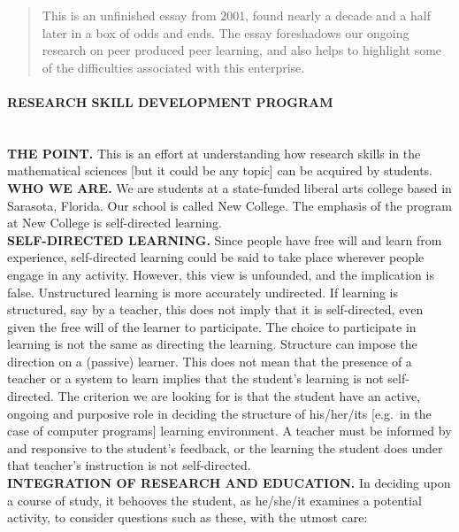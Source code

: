 
\begin{quote}
This is an unfinished essay from 2001, found nearly a decade and a
half later in a box of odds and ends. The essay foreshadows our
ongoing research on peer produced peer learning, and also helps to
highlight some of the difficulties associated with this enterprise.
\end{quote}

\paragraph{RESEARCH SKILL DEVELOPMENT PROGRAM}\quad\\

\noindent \textbf{THE POINT.} This is an effort at understanding how
research skills in the mathematical sciences [but it could be any
topic] can be acquired by students. \\

\noindent \textbf{WHO WE ARE.} We are students at a state-funded liberal
arts college based in Sarasota, Florida.  Our school is called New
College.  The emphasis of the program at New College is self-directed
learning. \\

\noindent \textbf{SELF-DIRECTED LEARNING.} Since people have free will and
learn from experience, self-directed learning could be said to take
place wherever people engage in any activity.  However, this view is
unfounded, and the implication is false.  Unstructured learning is
more accurately undirected.  If learning is structured, say by a
teacher, this does not imply that it is self-directed, even given the
free will of the learner to participate.  The choice to participate in
learning is not the same as directing the learning.  Structure can
impose the direction on a (passive) learner.  This does not mean that
the presence of a teacher or a system to learn implies that the
student's learning is not self-directed.  The criterion we are looking
for is that the student have an active, ongoing and purposive role in
deciding the structure of his/her/its [e.g.~in the case of computer
programs] learning environment.  A teacher must be informed by and
responsive to the student's feedback, or the learning the student does
under that teacher's instruction is not self-directed. \\

\noindent \textbf{INTEGRATION OF RESEARCH AND EDUCATION.} In deciding upon
a course of study, it behooves the student, as he/she/it examines a
potential activity, to consider questions such as these, with the
utmost care:

